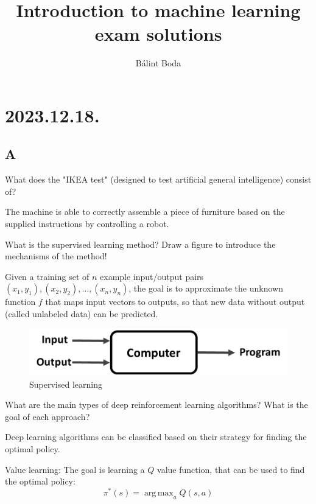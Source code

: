 \documentclass[a4paper,12pt,answers]{exam}
\title{\huge{Introduction to machine learning} \\[-4pt] \large exam solutions \vspace{-15pt}}
\author{Bálint Boda}
\date{\vspace{-12pt}{Fall 2023}}
\DeclareMathOperator*{\argmax}{arg\,max}
\begin{document}
\maketitle
\tableofcontents
\newpage

\section{2023.12.18.}
\subsection{A}

\begin{questions}
	\question[10]
	What does the "IKEA test" (designed to test artificial general intelligence) consist of?
	
	\begin{solution}
		The machine is able to correctly assemble a piece of furniture based on the supplied instructions by controlling a robot.
	\end{solution}
	
	\question[15]
	What is the supervised learning method? Draw a figure to introduce the mechanisms of the method!
	
	\begin{solution}
		Given a training set of $n$ example input/output pairs $(x_1,y_1), (x_2,y_2), \dots, (x_n, y_n)$, the goal is to approximate the unknown function $f$ that maps input vectors to outputs, so that new data without output (called unlabeled data) can be predicted.
		
		\begin{figure}[H]
			\centering
			\includegraphics[width=0.7\linewidth]{supervised_learning}
			\caption{Supervised learning}
			\label{fig:supervisedlearning}
		\end{figure}
	\end{solution}
	
	\question[15]
	What are the main types of deep reinforcement learning algorithms? What is the goal of each approach?
	
	\begin{solution}
		Deep learning algorithms can be classified based on their strategy for finding the optimal policy.
		
		Value learning: The goal is learning a $Q$ value function, that can be used to find the optimal policy:
		\[
		\pi^*(s) = \argmax_{a}{Q(s,a)}
		\]
		

\end{solution}
\end{questions}
\end{document}
